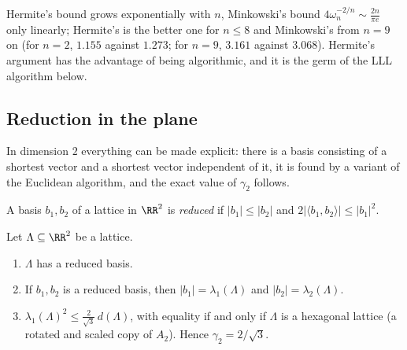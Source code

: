 Hermite's bound grows exponentially with $n$, Minkowski's bound $4\omega_n^{-2/n} \sim \frac{2n}{\pi e}$ only linearly; Hermite's is the better one for $n \leq 8$ and Minkowski's from $n = 9$ on
(for $n = 2$, $1.155$ against $1.273$; for $n = 9$, $3.161$ against $3.068$). Hermite's argument has the advantage of being algorithmic, and it is the germ of the LLL algorithm below.

\subsection{Reduction in the plane}\label{geometry-of-numbers:subsection-plane}

In dimension $2$ everything can be made explicit: there is a basis consisting of a shortest vector and a shortest vector independent of it, it is found by a variant of the Euclidean algorithm, and
the exact value of $\gamma_2$ follows.

\begin{definition}\label{geometry-of-numbers:definition-reduced-basis}
A basis $b_1, b_2$ of a lattice in $\RR^2$ is \emph{reduced} if $|b_1| \leq |b_2|$ and $2|\langle b_1, b_2 \rangle| \leq |b_1|^2$.
\end{definition}

\begin{theorem}\label{geometry-of-numbers:theorem-gauss-reduction}
Let $\Lambda \subseteq \RR^2$ be a lattice.
\begin{enumerate}
\item $\Lambda$ has a reduced basis.
\item If $b_1, b_2$ is a reduced basis, then $|b_1| = \lambda_1(\Lambda)$ and $|b_2| = \lambda_2(\Lambda)$.
\item $\lambda_1(\Lambda)^2 \leq \frac{2}{\sqrt3}\,d(\Lambda)$, with equality if and only if $\Lambda$ is a hexagonal lattice (a rotated and scaled copy of $A_2$). Hence $\gamma_2 = 2/\sqrt3$.
\end{enumerate}
\end{theorem}

